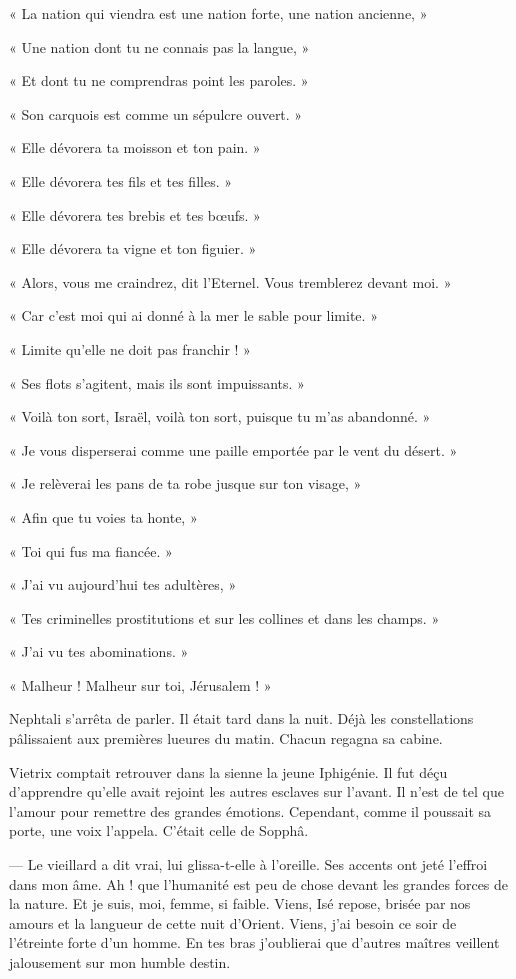 \documentclass[a4paper, 11pt, oneside, polutonikogreek, french]{article}
\begin{document}
« La nation qui viendra est une nation forte, une nation ancienne, »

« Une nation dont tu ne connais pas la langue, »

« Et dont tu ne comprendras point les paroles. »

« Son carquois est comme un sépulcre ouvert. »

« Elle dévorera ta moisson et ton pain. »

« Elle dévorera tes fils et tes filles. »

« Elle dévorera tes brebis et tes bœufs. »

« Elle dévorera ta vigne et ton figuier. »

« Alors, vous me craindrez, dit l'Eternel. Vous tremblerez devant moi. »

« Car c'est moi qui ai donné à la mer le sable pour limite. »

« Limite qu'elle ne doit pas franchir ! »

« Ses flots s'agitent, mais ils sont impuissants. »

« Voilà ton sort, Israël, voilà ton sort, puisque tu m'as abandonné. »

« Je vous disperserai comme une paille emportée par le vent du désert. »

« Je relèverai les pans de ta robe jusque sur ton visage, »

« Afin que tu voies ta honte, »

« Toi qui fus ma fiancée. »

« J'ai vu aujourd'hui tes adultères, »

« Tes criminelles prostitutions et sur les collines et dans les champs. »

« J'ai vu tes abominations. »

« Malheur ! Malheur sur toi, Jérusalem ! »

\bigskip
\centerline{\EightStarTaper}
\centerline{\EightStarTaper\EightStarTaper}
\bigskip

Nephtali s'arrêta de parler. Il était tard dans la nuit. Déjà les constellations pâlissaient aux premières lueures du matin. Chacun regagna sa cabine.

Vietrix comptait retrouver dans la sienne la jeune Iphigénie. Il fut déçu d'apprendre qu'elle avait rejoint les autres esclaves sur l'avant. Il n'est de tel que l'amour pour remettre des grandes émotions. Cependant, comme il poussait sa porte, une voix l'appela. C'était celle de Sopphâ.

--- Le vieillard a dit vrai, lui glissa-t-elle à l'oreille. Ses accents ont jeté l'effroi dans mon âme. Ah ! que l'humanité est peu de chose devant les grandes forces de la nature. Et je suis, moi, femme, si faible. Viens, Isé repose, brisée par nos amours et la langueur de cette nuit d'Orient. Viens, j'ai besoin ce soir de l'étreinte forte d'un homme. En tes bras j'oublierai que d'autres maîtres veillent jalousement sur mon humble destin.
\end{document}
